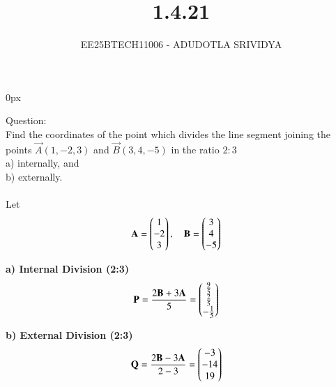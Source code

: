 \documentclass[journal]{IEEEtran}
\begin{document}

\title{1.4.21}
\author{EE25BTECH11006 - ADUDOTLA SRIVIDYA }
{\let\newpage\relax\maketitle}
\renewcommand{\thefigure}{\theenumi}
\renewcommand{\thetable}{\theenumi}
\setlength{\intextsep}{10pt}
\renewcommand{\thetable}{\theenumi}
\parindent 0px

Question:\\
Find the coordinates of the point which divides the line segment joining the points 
$\vec{A}(1,-2,3)$ and $\vec{B}(3,4,-5)$ in the ratio $2:3$ \\
a) internally, and \\
b) externally.\\

\solution\\
Let 
\begin{align*}
    \mathbf{A} &= \begin{pmatrix}1\\-2\\3\end{pmatrix}, \quad 
    \mathbf{B} = \begin{pmatrix}3\\4\\-5\end{pmatrix}
\end{align*}

\textbf{a) Internal Division (2:3)}\\
\begin{align*}
    \mathbf{P} &= \frac{2\mathbf{B} + 3\mathbf{A}}{5} 
             = \begin{pmatrix}\tfrac{9}{5}\\\tfrac{2}{5}\\-\tfrac{1}{5}\end{pmatrix}
\end{align*}

\textbf{b) External Division (2:3)}\\
\begin{align*}
    \mathbf{Q} &= \frac{2\mathbf{B} - 3\mathbf{A}}{2-3} 
             = \begin{pmatrix}-3\\-14\\19\end{pmatrix}
\end{align*}
\end{document}
